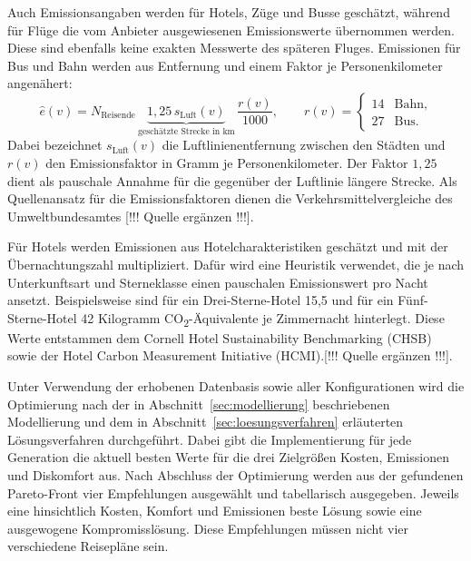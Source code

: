 Auch Emissionsangaben werden für Hotels, Züge und Busse geschätzt, während für Flüge die vom Anbieter ausgewiesenen Emissionswerte übernommen werden. Diese sind ebenfalls keine exakten Messwerte des späteren Fluges. Emissionen für Bus und Bahn werden aus Entfernung und einem Faktor je Personenkilometer angenähert:
\begin{equation}
  \widehat e(v)
  = N_{\mathrm{Reisende}}\,
    \underbrace{1{,}25\,s_{\mathrm{Luft}}(v)}_{\text{geschätzte Strecke in km}}\,
    \frac{r(v)}{1000},
  \qquad
  r(v)=
  \begin{cases}
    14 & \text{Bahn},\\
    27 & \text{Bus}.
  \end{cases}
\end{equation}
Dabei bezeichnet $s_{\mathrm{Luft}}(v)$ die Luftlinienentfernung zwischen den Städten und $r(v)$ den Emissionsfaktor in Gramm je Personenkilometer. Der Faktor $1{,}25$ dient als pauschale Annahme für die gegenüber der Luftlinie längere Strecke. Als Quellenansatz für die Emissionsfaktoren dienen die Verkehrsmittelvergleiche des Umweltbundesamtes [!!! Quelle ergänzen !!!].


Für Hotels werden Emissionen aus Hotelcharakteristiken geschätzt und mit der Übernachtungszahl multipliziert. Dafür wird eine Heuristik verwendet, die je nach Unterkunftsart und Sterneklasse einen pauschalen Emissionswert pro Nacht ansetzt. Beispielsweise sind für ein Drei-Sterne-Hotel 15{,}5 und für ein Fünf-Sterne-Hotel 42 Kilogramm CO\textsubscript{2}-Äquivalente je Zimmernacht hinterlegt. Diese Werte entstammen dem Cornell Hotel Sustainability Benchmarking (CHSB) sowie der Hotel Carbon Measurement Initiative (HCMI).[!!! Quelle ergänzen !!!].


Unter Verwendung der erhobenen Datenbasis sowie aller Konfigurationen wird die Optimierung nach der in Abschnitt~\ref{sec:modellierung} beschriebenen Modellierung und dem in Abschnitt~\ref{sec:loesungsverfahren} erläuterten Lösungsverfahren durchgeführt. Dabei gibt die Implementierung für jede Generation die aktuell besten Werte für die drei Zielgrößen Kosten, Emissionen und Diskomfort aus. Nach Abschluss der Optimierung werden aus der gefundenen Pareto-Front vier Empfehlungen ausgewählt und tabellarisch ausgegeben. Jeweils eine hinsichtlich Kosten, Komfort und Emissionen beste Lösung sowie eine ausgewogene Kompromisslösung. Diese Empfehlungen müssen nicht vier verschiedene Reisepläne sein.

